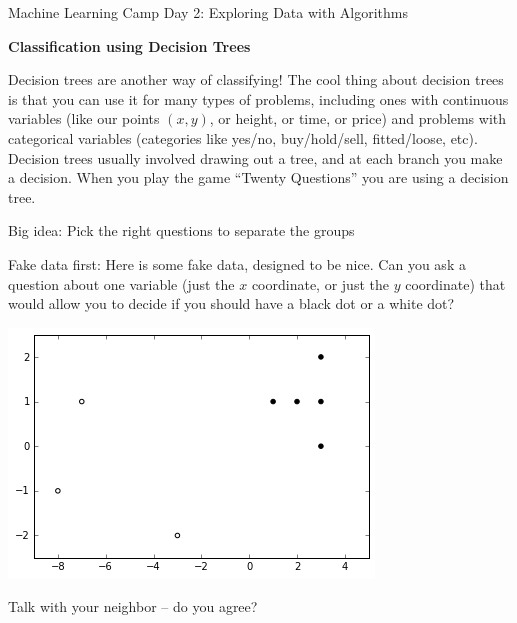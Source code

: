 \documentclass[10pt]{article}
\newcommand{\headerclass}{Machine Learning Camp}
\newcommand{\headersection}{Day 2: Exploring Data with Algorithms}
\newcommand{\headertitle}{Classification using Decision Trees}
\begin{document}
\headerclass\xspace {} \headersection\\
\begin{center}{ \large \textbf{\headertitle} }\end{center}



Decision trees are another way of classifying! The cool thing about decision trees is that you can use it for many types of problems, including ones with continuous variables (like our points $(x,y)$, or height, or time, or price) and problems with categorical variables (categories like yes/no, buy/hold/sell, fitted/loose, etc). 
	Decision trees usually involved drawing out a tree, and at each branch you make a decision. When you play the game ``Twenty Questions'' you are using a decision tree.
\bigskip
\begin{center}
Big idea: Pick the right questions to separate the groups
\end{center}
\bigskip
Fake data first:
	Here is some fake data, designed to be nice. Can you ask a question about one variable (just the $x$ coordinate, or just the $y$ coordinate) that would allow you to decide if you should have a black dot or a white dot?

 
\begin{center}
\includegraphics{TwoClusters.png}
\end{center}

Talk with your neighbor -- do you agree?


\pagebreak
\end{document}
